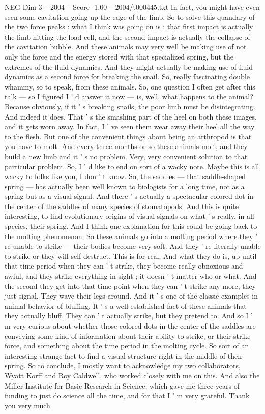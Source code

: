 \begin{textsample}{NEG Dim 3 – 2004 – Score -1.00 – 2004/t000445.txt}
In fact, you might have even seen some cavitation going up the edge of the limb.
So to solve this quandary of the two force peaks : what I think was going on is : that first impact is actually the limb hitting the load cell, and the second impact is actually the collapse of the cavitation bubble.
And these animals may very well be making use of not only the force and the energy stored with that specialized spring, but the extremes of the fluid dynamics.
And they might actually be making use of fluid dynamics as a second force for breaking the snail.
So, really fascinating double whammy, so to speak, from these animals.
So, one question I often get after this talk — so I figured I ' d answer it now — is, well, what happens to the animal?
Because obviously, if it ' s breaking snails, the poor limb must be disintegrating.
And indeed it does.
That ' s the smashing part of the heel on both these images, and it gets worn away.
In fact, I ' ve seen them wear away their heel all the way to the flesh.
But one of the convenient things about being an arthropod is that you have to molt.
And every three months or so these animals molt, and they build a new limb and it ' s no problem.
Very, very convenient solution to that particular problem.
So, I ' d like to end on sort of a wacky note.
Maybe this is all wacky to folks like you, I don ' t know.
So, the saddles — that saddle-shaped spring — has actually been well known to biologists for a long time, not as a spring but as a visual signal.
And there ' s actually a spectacular colored dot in the center of the saddles of many species of stomatopods.
And this is quite interesting, to find evolutionary origins of visual signals on what ' s really, in all species, their spring.
And I think one explanation for this could be going back to the molting phenomenon.
So these animals go into a molting period where they ' re unable to strike — their bodies become very soft.
And they ' re literally unable to strike or they will self-destruct.
This is for real.
And what they do is, up until that time period when they can ' t strike, they become really obnoxious and awful, and they strike everything in sight ; it doesn ' t matter who or what.
And the second they get into that time point when they can ' t strike any more, they just signal.
They wave their legs around.
And it ' s one of the classic examples in animal behavior of bluffing.
It ' s a well-established fact of these animals that they actually bluff.
They can ' t actually strike, but they pretend to.
And so I ' m very curious about whether those colored dots in the center of the saddles are conveying some kind of information about their ability to strike, or their strike force, and something about the time period in the molting cycle.
So sort of an interesting strange fact to find a visual structure right in the middle of their spring.
So to conclude, I mostly want to acknowledge my two collaborators, Wyatt Korff and Roy Caldwell, who worked closely with me on this.
And also the Miller Institute for Basic Research in Science, which gave me three years of funding to just do science all the time, and for that I ' m very grateful.
Thank you very much.

\end{textsample}
